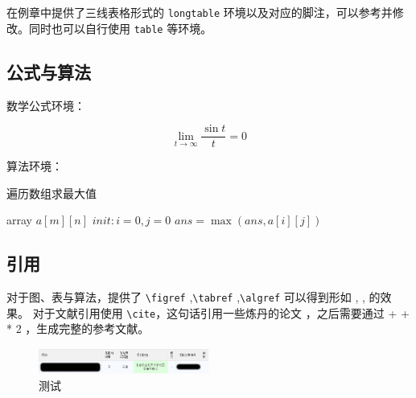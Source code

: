 \documentclass[lang=cn,12pt]{frbpaper}
\begin{document}
在例章中提供了三线表格形式的 \lstinline{longtable} 环境以及对应的脚注，可以参考并修改。同时也可以自行使用 \lstinline{table} 等环境。

\subsection{公式与算法} 

数学公式环境：

\[\lim_{t \rightarrow \infty} \dfrac{\sin t}{t} = 0 \]

算法环境：

\begin{algorithm}
    \caption{遍历数组求最大值}
    \label{alg:array}
    \begin{algorithmic}
        \REQUIRE array \(a[m][n]\)
        \STATE \(init: i = 0, j = 0\)
        \REPEAT 
        \REPEAT
        \STATE \(ans = \max (ans, a[i][j])\)
    \end{algorithmic}
\end{algorithm}

\subsection{引用}

对于图、表与算法，提供了 \lstinline{\figref} ,\lstinline{\tabref} ,\lstinline{\algref} 可以得到形如 , ,  的效果。
对于文献引用使用 \lstinline{\cite}，这句话引用一些炼丹的论文 \cite{ghostnet,parashar2017scnn,park2017scale,abok}，之后需要通过  + +  * 2 ，生成完整的参考文献。


\begin{figure}[htb]\footnotesize
    \centering
    \includegraphics[width=0.5\textwidth]{figures/pass.png}
    \caption{测试}\label{fig:test}
    \label{fig:01}
\end{figure}
\end{document}
